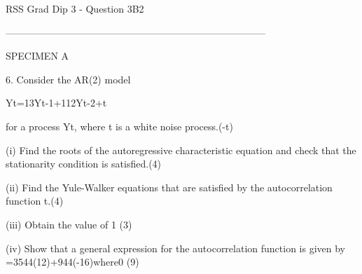 

RSS Grad Dip 3 - Question 3B2

 

 



--------------------------------------------------------------------------------


SPECIMEN A

6. Consider the AR(2) model

 

 

Yt=13Yt-1+112Yt-2+t


for a process {Yt}, where {t} is a white noise process.(-t)


(i) Find the roots of the autoregressive characteristic equation and check that the stationarity condition is satisfied.(4)

 

(ii) Find the Yule-Walker equations that are satisfied by the autocorrelation function t.(4)

 

(iii) Obtain the value of 1        (3)

 

(iv) Show that a general expression for the autocorrelation function is given by
=3544(12)+944(-16)where0     (9)
